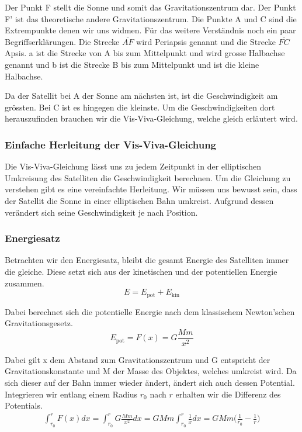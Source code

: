 \begin{refsection}
\noindent{}Der Punkt F stellt die Sonne und somit das Gravitationszentrum dar. Der Punkt F' ist das theoretische andere Gravitationszentrum. Die Punkte A und C sind die Extrempunkte denen wir uns widmen. Für das weitere Verständnis noch ein paar Begriffserklärungen. Die Strecke $\overline{AF}$ wird Periapsis genannt und die Strecke $\overline{FC}$ Apsis. a ist die Strecke von A bis zum Mittelpunkt und wird grosse Halbachse genannt und b ist die Strecke B bis zum Mittelpunkt und ist die kleine Halbachse.

Da der Satellit bei A der Sonne am nächsten ist, ist die Geschwindigkeit am grössten. Bei C ist es hingegen die kleinste. Um die Geschwindigkeiten dort herauszufinden brauchen wir die Vis-Viva-Gleichung, welche gleich erläutert wird.

\subsubsection{Einfache Herleitung der Vis-Viva-Gleichung}
Die Vis-Viva-Gleichung lässt uns zu jedem Zeitpunkt in der elliptischen Umkreisung des Satelliten die Geschwindigkeit berechnen. Um die Gleichung zu verstehen gibt es eine vereinfachte Herleitung. Wir müssen uns bewusst sein, dass der Satellit die Sonne in einer elliptischen Bahn umkreist. Aufgrund dessen verändert sich seine Geschwindigkeit je nach Position. 

\subsubsection{Energiesatz}
Betrachten wir den Energiesatz, bleibt die gesamt Energie des Satelliten immer die gleiche. Diese setzt sich aus der kinetischen und der potentiellen Energie zusammen.
\begin{equation}
E = E_{\text{pot}} + E_{\text{kin}}
\end{equation}

\noindent{}Dabei berechnet sich die potentielle Energie nach dem klassischem Newton'schen Gravitationsgesetz.
\begin{equation}
E_{\text{pot}} = F(x) = G\frac{Mm}{x^2}
\end{equation}

\noindent{}Dabei gilt x dem Abstand zum Gravitationszentrum und G entspricht der Gravitationskonstante und M der Masse des Objektes, welches umkreist wird. Da sich dieser auf der Bahn immer wieder ändert, ändert sich auch dessen Potential. Integrieren wir entlang einem Radius $r_0$ nach $r$ erhalten wir die Differenz des Potentials. 
\begin{align*}
\int_{r_0}^{r} F(x) dx= \int_{r_0}^{r} G\frac{Mm}{x^2} dx = GMm \int_{r_0}^{r} \frac{1}{x} dx = GMm \biggr( \frac{1}{r_0} - \frac{1}{r}\biggr)
\end{align*}


\end{refsection}
